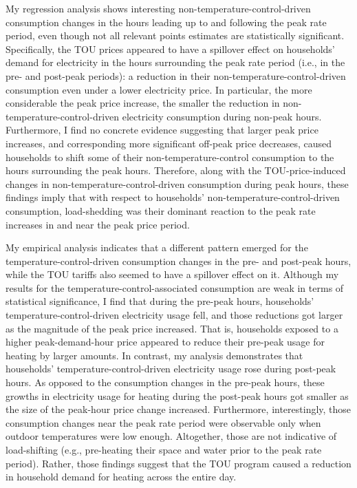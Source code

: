 My regression analysis shows interesting non-temperature-control-driven consumption changes in the hours leading up to and following the peak rate period, even though not all relevant points estimates are statistically significant. Specifically, the TOU prices appeared to have a spillover effect on households' demand for electricity in the hours surrounding the peak rate period (i.e., in the pre- and post-peak periods): a reduction in their non-temperature-control-driven consumption even under a lower electricity price. In particular, the more considerable the peak price increase, the smaller the reduction in non-temperature-control-driven electricity consumption during non-peak hours. Furthermore, I find no concrete evidence suggesting that larger peak price increases, and corresponding more significant off-peak price decreases, caused households to shift some of their non-temperature-control consumption to the hours surrounding the peak hours. Therefore, along with the TOU-price-induced changes in non-temperature-control-driven consumption during peak hours, these findings imply that with respect to households' non-temperature-control-driven consumption, load-shedding was their dominant reaction to the peak rate increases in and near the peak price period.

My empirical analysis indicates that a different pattern emerged for the temperature-control-driven consumption changes in the pre- and post-peak hours, while the TOU tariffs also seemed to have a spillover effect on it. Although my results for the temperature-control-associated consumption are weak in terms of statistical significance, I find that during the pre-peak hours, households' temperature-control-driven electricity usage fell, and those reductions got larger as the magnitude of the peak price increased. That is, households exposed to a higher peak-demand-hour price appeared to reduce their pre-peak usage for heating by larger amounts. In contrast, my analysis demonstrates that households' temperature-control-driven electricity usage rose during post-peak hours. As opposed to the consumption changes in the pre-peak hours, these growths in electricity usage for heating during the post-peak hours got smaller as the size of the peak-hour price change increased. Furthermore, interestingly, those consumption changes near the peak rate period were observable only when outdoor temperatures were low enough. Altogether, those are not indicative of load-shifting (e.g., pre-heating their space and water prior to the peak rate period). Rather, those findings suggest that the TOU program caused a reduction in household demand for heating across the entire day. 

